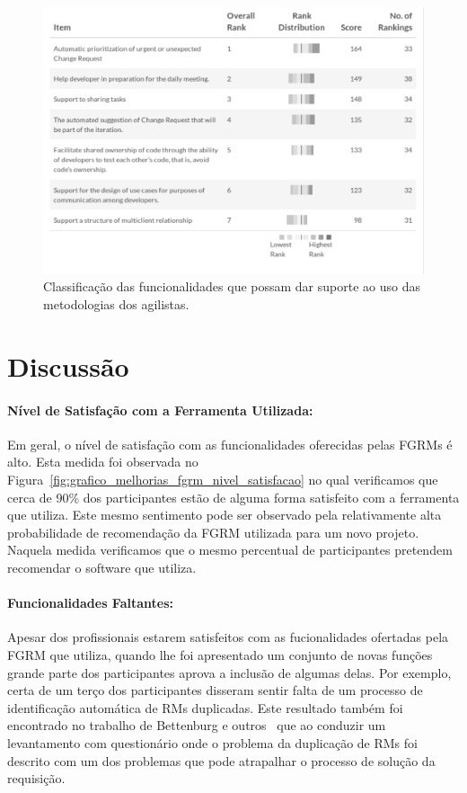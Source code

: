\begin{figure}[htpb]
	\centering
	\includegraphics[width=0.8\linewidth]{./chapter-pesquisa-com-profissionais/img/grafico_melhorias_fgrm_suporte_particas_ageis.pdf}
	\caption{Classificação das funcionalidades que possam dar suporte ao uso das
	metodologias dos agilistas.}
\label{fig:grafico_melhorias_fgrm_suporte_particas_ageis}
\end{figure}

\section{Discussão}

\paragraph{Nível de Satisfação com a Ferramenta Utilizada:}
\label{par:pesq_profissionais_nivel_de_satisfação}

Em geral, o nível de satisfação com as funcionalidades oferecidas pelas FGRMs é
alto. Esta medida foi observada no
Figura~\ref{fig:grafico_melhorias_fgrm_nivel_satisfacao} no qual verificamos que
cerca de 90\% dos participantes estão de alguma forma satisfeito com a
ferramenta que utiliza. Este mesmo sentimento pode ser observado pela
relativamente alta probabilidade de recomendação da FGRM utilizada para um novo
projeto. Naquela medida verificamos que o mesmo percentual de participantes
pretendem recomendar o software que utiliza.

\paragraph{Funcionalidades Faltantes:}
\label{par:pesq_profissionais_funcionalidades_faltantes}

Apesar dos profissionais estarem satisfeitos com as fucionalidades ofertadas
pela FGRM que utiliza, quando lhe foi apresentado um conjunto de novas funções
grande parte dos participantes aprova a inclusão de algumas delas. Por exemplo,
certa de um terço dos participantes disseram sentir falta de um processo de
identificação automática de RMs duplicadas. Este resultado também foi encontrado
no trabalho de Bettenburg e outros~\cite{bettenburg2008makes} que ao conduzir um
levantamento com questionário onde o problema da duplicação de RMs foi descrito
com um dos problemas que pode atrapalhar o processo de solução da requisição.

